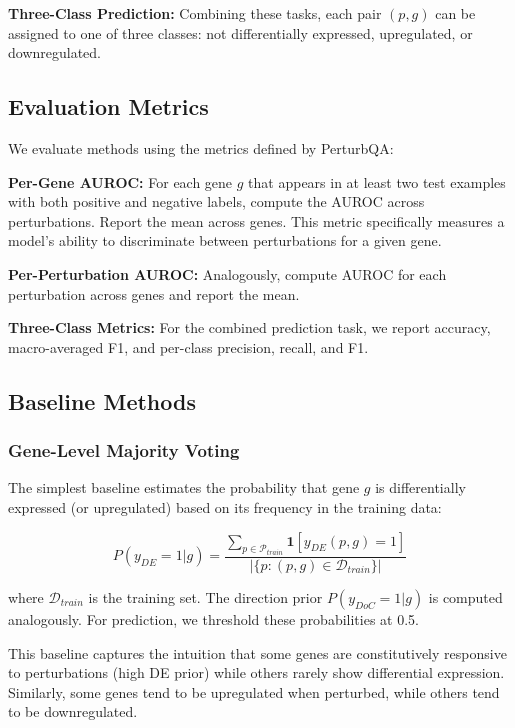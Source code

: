 \documentclass[11pt]{article}
\begin{document}
\textbf{Three-Class Prediction:} Combining these tasks, each pair $(p, g)$ can be assigned to one of three classes: not differentially expressed, upregulated, or downregulated.

\subsection{Evaluation Metrics}

We evaluate methods using the metrics defined by PerturbQA:

\textbf{Per-Gene AUROC:} For each gene $g$ that appears in at least two test examples with both positive and negative labels, compute the AUROC across perturbations. Report the mean across genes. This metric specifically measures a model's ability to discriminate between perturbations for a given gene.

\textbf{Per-Perturbation AUROC:} Analogously, compute AUROC for each perturbation across genes and report the mean.

\textbf{Three-Class Metrics:} For the combined prediction task, we report accuracy, macro-averaged F1, and per-class precision, recall, and F1.

\subsection{Baseline Methods}

\subsubsection{Gene-Level Majority Voting}

The simplest baseline estimates the probability that gene $g$ is differentially expressed (or upregulated) based on its frequency in the training data:

\begin{equation}
P(y_{DE} = 1 | g) = \frac{\sum_{p \in \mathcal{P}_{train}} \mathbf{1}[y_{DE}(p, g) = 1]}{|\{p : (p, g) \in \mathcal{D}_{train}\}|}
\end{equation}

where $\mathcal{D}_{train}$ is the training set. The direction prior $P(y_{DoC} = 1 | g)$ is computed analogously. For prediction, we threshold these probabilities at 0.5.

This baseline captures the intuition that some genes are constitutively responsive to perturbations (high DE prior) while others rarely show differential expression. Similarly, some genes tend to be upregulated when perturbed, while others tend to be downregulated.
\end{document}
